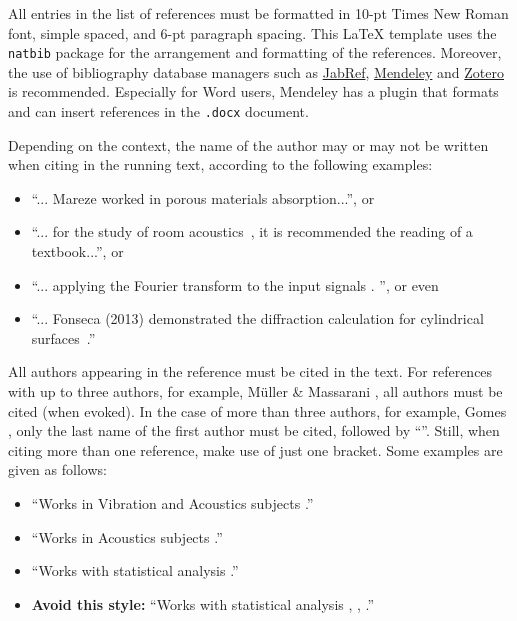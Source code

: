 \documentclass[12pt, a4paper, twoside, twocolumn]{article}
\begin{document}
All entries in the list of references must be formatted in 10-pt Times New Roman font, simple spaced, and 6-pt paragraph spacing. This \LaTeX\xspace template uses the \texttt{natbib} package for the arrangement and formatting of the references. Moreover, the use of bibliography database managers such as \href{http://www.jabref.org/}{JabRef}, \href{http://www.mendeley.com}{Mendeley} and \href{https://www.zotero.org/}{Zotero} is recommended. Especially for Word users, Mendeley has a plugin that formats and can insert references in the \texttt{.docx} document.

Depending on the context, the name of the author may or may not be written when citing in the running text, according to the following examples:

\begin{itemize}[noitemsep,topsep=0ex] \itemsep=4pt
	\item 	``... Mareze \etal \cite{Mareze-2019} worked in porous materials absorption...'', or
	\item ``... for the study of room acoustics~\cite{Brandao-2017}, it is recommended the reading of a textbook...'', or
	\item ``... applying the Fourier transform to the input signals \cite{Oppenheim-1996}. '', or even
	\item ``... Fonseca (2013) demonstrated the diffraction calculation for cylindrical surfaces~\cite{Fonseca-2013}.''
\end{itemize}

All authors appearing in the reference must be cited in the text. 
For references with up to three authors, for example,  Müller \& Massarani \cite{Muller-2001}, all authors must be cited (when evoked). In the case of more than three authors, for example, Gomes \etal \cite{Gomes-2015}, only the last name of the first author must be cited, followed by ``\etal''. Still, when citing more than one reference, make use of just one bracket. Some examples are given as follows:

\begin{itemize}[noitemsep,topsep=0ex] \itemsep=8pt
	\item ``Works in Vibration and Acoustics subjects \cite{Mareze-2017,Fonseca-2013,Brandao-2017}.''
	\item ``Works in Acoustics subjects \cite{Mareze-2017,Oppenheim-1996,Muller-2001,Mareze-2019}.''
	\item ``Works with statistical analysis \cite{Mareze-2017, Brandao-2017, Borges-2018}.''
	\item \textbf{Avoid this style:} ``Works with statistical analysis \cite{Mareze-2017}, \cite{Brandao-2017}, \cite{Ristow-2016}.''
\end{itemize}
\end{document}
